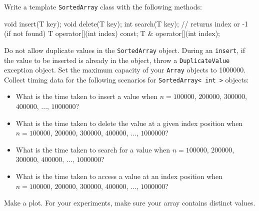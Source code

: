 Write a template \verb!SortedArray! class with the following 
methods:
\begin{console}[fontsize=\footnotesize]
void insert(T key);
void delete(T key);
int  search(T key); // returns index or -1 (if not found)
T    operator[](int index) const;
T &  operator[](int index);
\end{console}
Do not allow duplicate values in the \verb!SortedArray! object.
During an \verb!insert!, if the value to be inserted is already in the 
object, throw a \verb!DuplicateValue! exception object.
Set the maximum capacity of your \verb!Array! objects to 1000000.
Collect timing data for the following scenarios for 
\verb!SortedArray< int >! objects:
\begin{itemize}
\item What is the time taken to insert a value when
$n = 100000$, $200000$, $300000$, $400000$, ..., $1000000$?
\item What is the time taken to delete the value at a given index position
when
$n = 100000$, $200000$, $300000$, $400000$, ..., $1000000$?
\item What is the time taken to search for a value when
$n = 100000$, $200000$, $300000$, $400000$, ..., $1000000$?
\item What is the time taken to access a value at an index position when
$n = 100000$, $200000$, $300000$, $400000$, ..., $1000000$?
\end{itemize}
Make a plot.
For your experiments, make sure your array contains distinct values.
